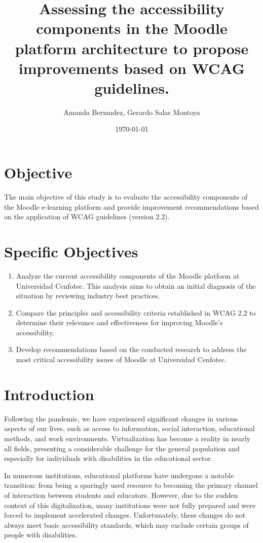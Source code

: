 \documentclass{article}
\title{Assessing the accessibility components in the Moodle platform architecture to propose improvements based on WCAG guidelines.}
\author{Amanda Bermudez, Gerardo Salas Montoya}
\date{\today}
\begin{document}
\maketitle

\section{Objective}
The main objective of this study is to evaluate the accessibility components of the Moodle e-learning platform and provide improvement recommendations based on the application of WCAG guidelines (version 2.2).

\section{Specific Objectives}
\begin{enumerate}
    \item Analyze the current accessibility components of the Moodle platform at Universidad Cenfotec. This analysis aims to obtain an initial diagnosis of the situation by reviewing industry best practices.
    \item Compare the principles and accessibility criteria established in WCAG 2.2 to determine their relevance and effectiveness for improving Moodle's accessibility.
    \item Develop recommendations based on the conducted research to address the most critical accessibility issues of Moodle at Universidad Cenfotec.
\end{enumerate}

\section{Introduction}
Following the pandemic, we have experienced significant changes in various aspects of our lives, such as access to information, social interaction, educational methods, and work environments. Virtualization has become a reality in nearly all fields, presenting a considerable challenge for the general population and especially for individuals with disabilities in the educational sector.

In numerous institutions, educational platforms have undergone a notable transition: from being a sparingly used resource to becoming the primary channel of interaction between students and educators. However, due to the sudden context of this digitalization, many institutions were not fully prepared and were forced to implement accelerated changes. Unfortunately, these changes do not always meet basic accessibility standards, which may exclude certain groups of people with disabilities.
\end{document}
